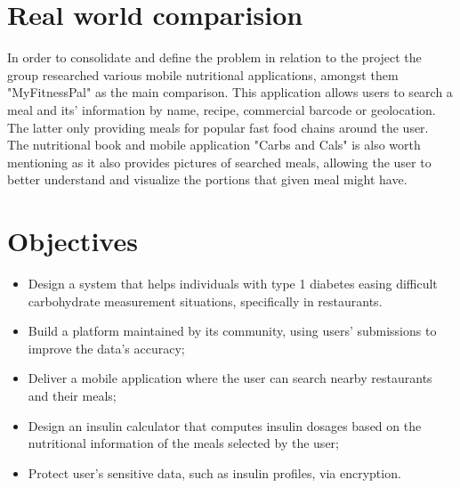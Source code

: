 \section{Real world comparision}

In order to consolidate and define the problem in relation to the project the group
researched various mobile nutritional applications, amongst them "MyFitnessPal" as the main comparison.
This application allows users to search a meal and its' information by name, recipe, commercial barcode or geolocation. The latter
only providing meals for popular fast food chains around the user.\\

The nutritional book and mobile application "Carbs and Cals" is also worth mentioning as it also provides pictures 
of searched meals, allowing the user to better understand and visualize the portions that given meal might have.

\section{Objectives}

\begin{itemize}
    \item Design a system that helps individuals with type 1 diabetes easing difficult carbohydrate measurement situations, specifically in restaurants.
    \item Build a platform maintained by its community, using users' submissions to improve the data's accuracy;
    \item Deliver a mobile application where the user can search nearby restaurants and their meals;
    \item Design an insulin calculator that computes insulin dosages based on the nutritional information of the meals selected by the user;
    \item Protect user's sensitive data, such as insulin profiles, via encryption.
\end{itemize}